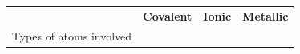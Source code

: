 \begin{enumerate}[noitemsep, label=\textbf{\arabic*}. ]
{\begin{tabular}[t]{|l|l|l|l|}
    
         &
    
    
        \textbf{Covalent} &
    
    
        \textbf{Ionic} &
    
    
        \textbf{Metallic}%
     \tabularnewline\cline{1-1}\cline{2-2}\cline{3-3}\cline{4-4}
    
    
        Types of atoms involved &
    
    
         &
    
    
         &
    
    
     \tabularnewline\cline{1-1}\cline{2-2}\cline{3-3}\cline{4-4}
    

\end{tabular}}
\end{enumerate}
